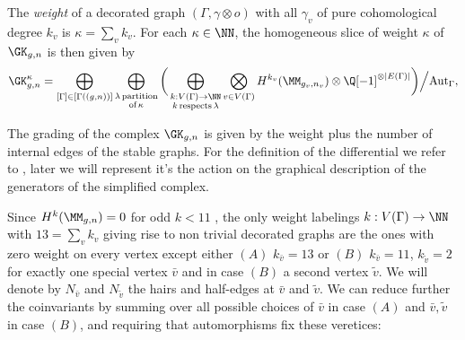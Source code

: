 The \emph{weight} of a decorated graph $(\Gamma,\gamma\otimes o)$ with all $\gamma_v$ of pure cohomological degree $k_v$ is $\kappa=\sum_v k_v$. For each $\kappa\in\NN$, the homogeneous slice of weight $\kappa$ of $\GK_{g,n}$ is then given by 
\begin{equation}\label{equ:GKweight}
    \GK^{\kappa}_{g,n} 
    = \bigoplus_{[\Gamma]\in[\Gamma((g,n))]} \bigoplus_{\substack{\lambda\,\text{partition} \\ \text{of}\,\kappa}} \bigg( \bigoplus_{\substack{k:V(\Gamma)\rightarrow \NN \\ k\,\text{respects}\,\lambda}}
    \bigotimes_{v\in V(\Gamma)}H^{k_v}(\MM_{g_v,n_v})\otimes \Q[-1]^{\otimes |E(\Gamma)|} \bigg) \Big/ \text{Aut}_{\Gamma},
\end{equation}

The grading of the complex $\GK_{g,n}$ is given by the weight plus the number of internal edges of the stable graphs. For the definition of the differential we refer to \cite{CLPW2}, later we will represent it's the action on the graphical description of the generators of the simplified complex.

Since $H^{k}(\MM_{g,n})=0$ for odd $k<11$ \cite{BergstromFaberPayne}, the only weight labelings $k:V(\Gamma)\rightarrow\NN$ with $13=\sum_v k_v$ giving rise to non trivial decorated graphs are the ones with zero weight on every vertex except either $(A)$ $k_{\bar{v}}=13$ or $(B)$ $k_{\bar{v}}=11$, $k_{\tilde{v}}=2$ for exactly one special vertex $\bar{v}$ and in case $(B)$ a second vertex $\tilde{v}$. We will denote by $N_{\bar{v}}$ and $N_{\tilde{v}}$ the hairs and half-edges at $\bar{v}$ and $\tilde{v}$. We can reduce further the coinvariants by summing over all possible choices of $\bar{v}$ in case $(A)$ and $\bar{v},\tilde{v}$ in case $(B)$, and requiring that automorphisms fix these veretices:

